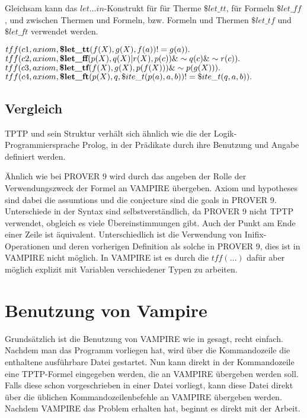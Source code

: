 \documentclass{acm_proc_article-sp-german}
\begin{document}
Gleichsam kann das $let\dots in$-Konstrukt für für Therme $\$let\_tt$, für Formeln $\$let\_ff$, und zwischen Thermen und Formeln, bzw. Formeln und Thermen $\$let\_tf$ und $\$let\_ft$ verwendet werden.

$tff(c1,axiom,\\
\textbf{\$let\_tt}(f(X),g(X),f(a))!=g(a)).$\\

$tff(c2,axiom,\\
\textbf{\$let\_ff}(p(X),q(X)|r(X),p(c)) \& \sim q(c)\& \sim r(c)).$\\

$tff(c3,axiom,\\
\textbf{\$let\_tf}(f(X),g(X),p(f(X)))\& \sim p(g(X))).$\\

$tff(c4,axiom,\\
\textbf{\$let\_ft}(p(X),q,\$ite\_t(p(a),a,b))!=\$ite\_t(q,a,b)).$\\

\subsection{Vergleich}
\label{subsec:tptpcomp}
TPTP und sein Struktur verhält sich ähnlich wie die der Logik-Programmiersprache Prolog, in der Prädikate durch ihre Benutzung und Angabe definiert werden.

Ähnlich wie bei PROVER 9 wird durch das angeben der Rolle der Verwendungszweck der Formel an VAMPIRE übergeben. Axiom und hypotheses sind dabei die assumtions und die conjecture sind die goals in PROVER 9.
Unterschiede in der Syntax sind selbstverständlich, da PROVER 9 nicht TPTP verwendet, obgleich es viele Übereinstimmungen gibt.
Auch der Punkt am Ende einer Zeile ist äquivalent. Unterschiedlich ist die Verwendung von Inifix-Operationen und deren vorherigen Definition als solche in PROVER 9, 
dies ist in VAMPIRE nicht möglich. In VAMPIRE ist es durch die $tff(\dots)$ dafür aber möglich explizit mit Variablen verschiedener Typen zu arbeiten.\cite{cav2013, prover9manual} 


\section{Benutzung von Vampire}
\label{sec:invocation}

Grundsätzlich ist die Benutzung von VAMPIRE wie in \cite{cav2013} gesagt, recht einfach. Nachdem man das Programm vorliegen hat, wird über die Kommandozeile die enthaltene ausführbare Datei gestartet. Nun kann direkt in der Kommandozeile eine TPTP-Formel eingegeben werden, die an VAMPIRE übergeben werden soll. Falls diese schon vorgeschrieben in einer Datei vorliegt, kann diese Datei direkt über die üblichen Kommandozeilenbefehle an VAMPIRE übergeben werden. Nachdem VAMPIRE das Problem erhalten hat, beginnt es direkt mit der Arbeit.
\end{document}

